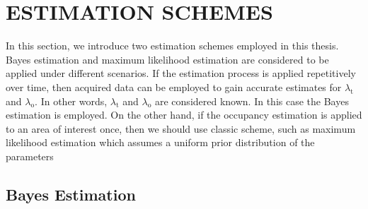 \chapter{ESTIMATION SCHEMES}
In this section, we introduce two estimation schemes employed in this thesis. Bayes estimation and maximum likelihood estimation are considered to be applied under different scenarios. If the estimation process is applied repetitively over time, then acquired data can be employed to gain accurate estimates for $\lambda_{\mathrm{t}}$ and $\lambda_{\mathrm{o}}$. In other words, $\lambda_{\mathrm{t}}$ and $\lambda_{\mathrm{o}}$ are considered known. In this case the Bayes estimation is employed. On the other hand, if the occupancy estimation is applied to an area of interest once, then we should use classic scheme, such as maximum likelihood estimation which assumes a uniform prior distribution of the parameters

\section{Bayes Estimation}

